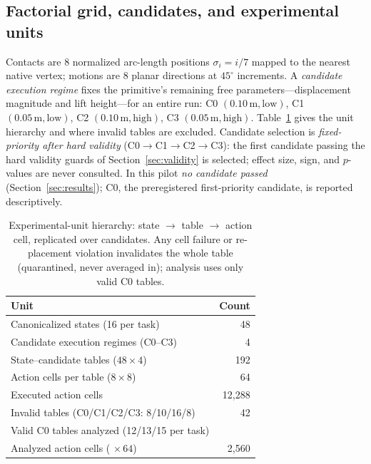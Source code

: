 \documentclass{article}
\begin{document}
\subsection{Factorial grid, candidates, and experimental units}
\label{sec:units}
Contacts are 8 normalized arc-length positions $\sigma_i = i/7$ mapped to
the nearest native vertex; motions are 8 planar directions at $45^\circ$
increments. A \emph{candidate execution regime} fixes the primitive's
remaining free parameters---displacement magnitude and lift height---for an
entire run: C0 $(0.10\,\text{m}, \text{low})$, C1 $(0.05\,\text{m},
\text{low})$, C2 $(0.10\,\text{m}, \text{high})$, C3 $(0.05\,\text{m},
\text{high})$. Table~\ref{tab:units} gives the unit hierarchy and where
invalid tables are excluded. Candidate selection is \emph{fixed-priority
after hard validity}
(C0$\to$C1$\to$C2$\to$C3): the first candidate passing the hard validity
guards of Section~\ref{sec:validity} is selected; effect size, sign, and
$p$-values are never consulted. In this pilot \emph{no candidate passed}
(Section~\ref{sec:results}); C0, the preregistered first-priority
candidate, is reported descriptively.

\begin{table}[t]
\centering\small
\caption{Experimental-unit hierarchy: state $\to$ table $\to$ action cell,
replicated over candidates. Any cell failure or re-placement violation
invalidates the whole table (quarantined, never averaged in); analysis uses
only valid C0 tables.}
\label{tab:units}
\begin{tabular}{lr}
\toprule
Unit & Count \\
\midrule
Canonicalized states (16 per task) & 48 \\
Candidate execution regimes (C0--C3) & 4 \\
State--candidate tables ($48\times4$) & 192 \\
Action cells per table ($8\times8$) & 64 \\
Executed action cells & 12{,}288 \\
Invalid tables (C0/C1/C2/C3: 8/10/16/8) & 42 \\
Valid C0 tables analyzed (12/13/15 per task) & \nstatestotal{} \\
Analyzed action cells (\nstatestotal{}$\,\times 64$) & 2{,}560 \\
\bottomrule
\end{tabular}
\end{table}
\end{document}
